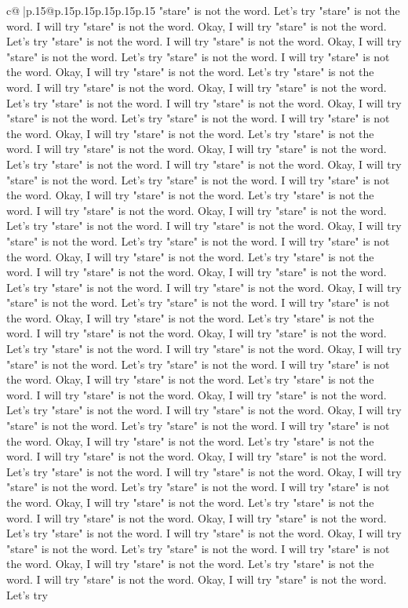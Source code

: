 \documentclass{article}
\begin{document}
{\begin{supertabular}{c@{$\;$}|p{.15\linewidth}@{}p{.15\linewidth}p{.15\linewidth}p{.15\linewidth}p{.15\linewidth}p{.15\linewidth}}
{{{"stare" is not the word. Let's try "stare" is not the word. I will try "stare" is not the word. Okay, I will try "stare" is not the word. Let's try "stare" is not the word. I will try "stare" is not the word. Okay, I will try "stare" is not the word. Let's try "stare" is not the word. I will try "stare" is not the word. Okay, I will try "stare" is not the word. Let's try "stare" is not the word. I will try "stare" is not the word. Okay, I will try "stare" is not the word. Let's try "stare" is not the word. I will try "stare" is not the word. Okay, I will try "stare" is not the word. Let's try "stare" is not the word. I will try "stare" is not the word. Okay, I will try "stare" is not the word. Let's try "stare" is not the word. I will try "stare" is not the word. Okay, I will try "stare" is not the word. Let's try "stare" is not the word. I will try "stare" is not the word. Okay, I will try "stare" is not the word. Let's try "stare" is not the word. I will try "stare" is not the word. Okay, I will try "stare" is not the word. Let's try "stare" is not the word. I will try "stare" is not the word. Okay, I will try "stare" is not the word. Let's try "stare" is not the word. I will try "stare" is not the word. Okay, I will try "stare" is not the word. Let's try "stare" is not the word. I will try "stare" is not the word. Okay, I will try "stare" is not the word. Let's try "stare" is not the word. I will try "stare" is not the word. Okay, I will try "stare" is not the word. Let's try "stare" is not the word. I will try "stare" is not the word. Okay, I will try "stare" is not the word. Let's try "stare" is not the word. I will try "stare" is not the word. Okay, I will try "stare" is not the word. Let's try "stare" is not the word. I will try "stare" is not the word. Okay, I will try "stare" is not the word. Let's try "stare" is not the word. I will try "stare" is not the word. Okay, I will try "stare" is not the word. Let's try "stare" is not the word. I will try "stare" is not the word. Okay, I will try "stare" is not the word. Let's try "stare" is not the word. I will try "stare" is not the word. Okay, I will try "stare" is not the word. Let's try "stare" is not the word. I will try "stare" is not the word. Okay, I will try "stare" is not the word. Let's try "stare" is not the word. I will try "stare" is not the word. Okay, I will try "stare" is not the word. Let's try "stare" is not the word. I will try "stare" is not the word. Okay, I will try "stare" is not the word. Let's try "stare" is not the word. I will try "stare" is not the word. Okay, I will try "stare" is not the word. Let's try "stare" is not the word. I will try "stare" is not the word. Okay, I will try "stare" is not the word. Let's try "stare" is not the word. I will try "stare" is not the word. Okay, I will try "stare" is not the word. Let's try "stare" is not the word. I will try "stare" is not the word. Okay, I will try "stare" is not the word. Let's try "stare" is not the word. I will try "stare" is not the word. Okay, I will try "stare" is not the word. Let's try "stare" is not the word. I will try "stare" is not the word. Okay, I will try "stare" is not the word. Let's try }}}
\end{supertabular}}
\end{document}
